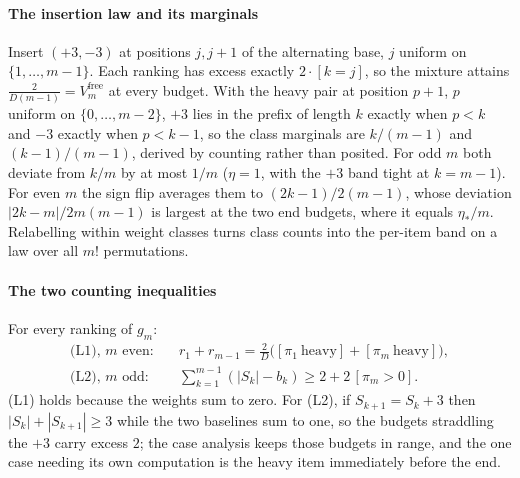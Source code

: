 \paragraph{The insertion law and its marginals} Insert $(+3,-3)$ at positions $j,j+1$ of
the alternating base, $j$ uniform on $\{1,\dots,m-1\}$. Each ranking has excess exactly
$2\cdot[k=j]$, so the mixture attains $\frac{2}{D(m-1)}=V^{\mathrm{free}}_{m}$ at every budget.
With the heavy pair at position $p+1$, $p$ uniform on $\{0,\dots,m-2\}$, $+3$ lies in the
prefix of length $k$ exactly when $p<k$ and $-3$ exactly when $p<k-1$, so the class
marginals are $k/(m-1)$ and $(k-1)/(m-1)$, derived by counting rather than posited. For odd
$m$ both deviate from $k/m$ by at most $1/m$ ($\eta=1$, with the $+3$ band tight at
$k=m-1$). For even $m$ the sign flip averages them to $(2k-1)/2(m-1)$, whose deviation
$|2k-m|/2m(m-1)$ is largest at the two end budgets, where it equals $\eta_{*}/m$. Relabelling
within weight classes turns class counts into the per-item band on a law over all $m!$
permutations.


\paragraph{The two counting inequalities} For every ranking of $g_{m}$:
\begin{align*}
\text{(L1), $m$ even:}\quad & r_{1}+r_{m-1}=\tfrac{2}{D}\bigl([\pi_{1}\ \text{heavy}]
  +[\pi_{m}\ \text{heavy}]\bigr),\\
\text{(L2), $m$ odd:}\quad & \textstyle\sum_{k=1}^{m-1}(|S_{k}|-b_{k})\ge
  2+2\,[\pi_{m}>0].
\end{align*}
(L1) holds because the weights sum to zero. For (L2), if $S_{k+1}=S_{k}+3$ then
$|S_{k}|+|S_{k+1}|\ge3$ while the two baselines sum to one, so the budgets straddling the
$+3$ carry excess $2$; the case analysis keeps those budgets in range, and the one case
needing its own computation is the heavy item immediately before the end.

